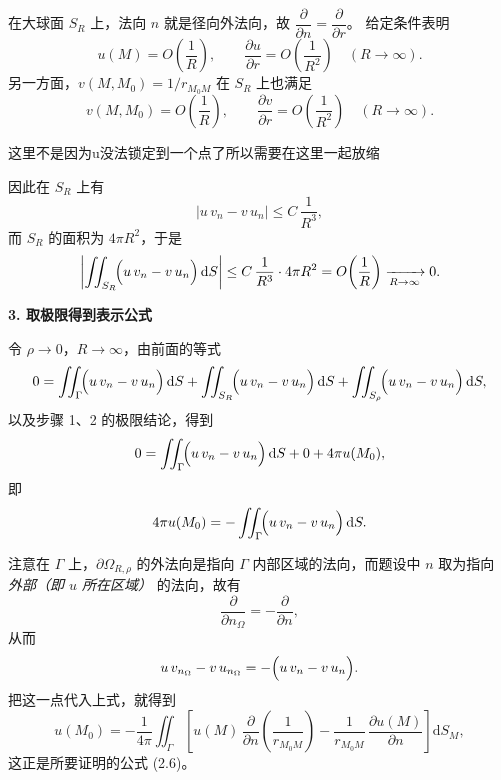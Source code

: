 \begin{solution}
在大球面 $S_R$ 上，法向 $n$ 就是径向外法向，故 $\dfrac{\partial}{\partial n}=\dfrac{\partial}{\partial r}$。
给定条件表明
\[
u(M)=O\!\left(\frac{1}{R}\right),\qquad
\frac{\partial u}{\partial r}=O\!\left(\frac{1}{R^2}\right)
\quad (R\to\infty).
\]
另一方面，$v(M,M_0)=1/r_{M_0M}$ 在 $S_R$ 上也满足
\[
v(M,M_0)=O\!\left(\frac{1}{R}\right),\qquad
\frac{\partial v}{\partial r}=O\!\left(\frac{1}{R^2}\right)
\quad (R\to\infty).
\]
\begin{dxtips}
    这里不是因为u没法锁定到一个点了所以需要在这里一起放缩
\end{dxtips}
因此在 $S_R$ 上有
\[
\bigl|u\,v_n - v\,u_n\bigr|
\le C\,\frac{1}{R^3},
\]
而 $S_R$ 的面积为 $4\pi R^2$，于是
\[
\left|
\iint_{S_R}\!\Bigl(u\,v_n - v\,u_n\Bigr)\,\mathrm dS
\right|
\le C\,\frac{1}{R^3}\cdot 4\pi R^2
= O\!\left(\frac{1}{R}\right)\xrightarrow[R\to\infty]{}0.
\]

\medskip
\noindent\textbf{3. 取极限得到表示公式}

令 $\rho\to0$，$R\to\infty$，由前面的等式
\[
0
= \iint_{\Gamma}\!\Bigl(u\,v_n - v\,u_n\Bigr)\,\mathrm dS
 +\iint_{S_R}\!\Bigl(u\,v_n - v\,u_n\Bigr)\,\mathrm dS
 +\iint_{S_\rho}\!\Bigl(u\,v_n - v\,u_n\Bigr)\,\mathrm dS,
\]
以及步骤 1、2 的极限结论，得到
\[
0
= \iint_{\Gamma}\!\Bigl(u\,v_n - v\,u_n\Bigr)\,\mathrm dS
 + 0 + 4\pi u(M_0),
\]
即
\[
4\pi u(M_0)
= -\iint_{\Gamma}\!\Bigl(u\,v_n - v\,u_n\Bigr)\,\mathrm dS.
\]

注意在 $\Gamma$ 上，$\partial\Omega_{R,\rho}$ 的外法向是指向 $\Gamma$ 内部区域的法向，而题设中 $n$ 取为指向 \emph{外部（即 $u$ 所在区域）} 的法向，故有
\[
\frac{\partial}{\partial n_{\Omega}}
= -\frac{\partial}{\partial n},
\]
从而
\[
u\,v_{n_{\Omega}} - v\,u_{n_{\Omega}}
= -\Bigl(u\,v_n - v\,u_n\Bigr).
\]
把这一点代入上式，就得到
\[
u(M_0)
= -\frac{1}{4\pi}
  \iint_{\Gamma}
  \left[
    u(M)\,\frac{\partial}{\partial n}
      \!\left(\frac{1}{r_{M_0M}}\right)
    - \frac{1}{r_{M_0M}}\,
      \frac{\partial u(M)}{\partial n}
  \right]\mathrm dS_M ,
\]
这正是所要证明的公式 \textup{(2.6)}。
\end{solution}
